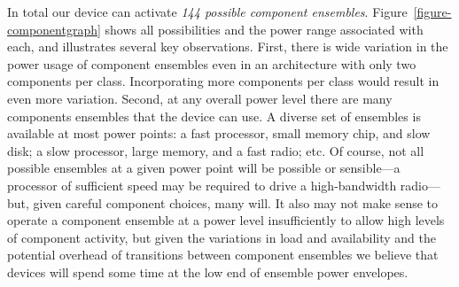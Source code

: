 In total our device can activate \textit{144 possible component ensembles}.
Figure~\ref{figure-componentgraph} shows all possibilities and the power
range associated with each, and illustrates several key observations. First,
there is wide variation in the power usage of component ensembles even in an
architecture with only two components per class. Incorporating more
components per class would result in even more variation. Second, at any
overall power level there are many components ensembles that the device can
use. A diverse set of ensembles is available at most power points: a fast
processor, small memory chip, and slow disk; a slow processor, large memory,
and a fast radio; etc. Of course, not all possible ensembles at a given power
point will be possible or sensible---a processor of sufficient speed may be
required to drive a high-bandwidth radio---but, given careful component
choices, many will. It also may not make sense to operate a component
ensemble at a power level insufficiently to allow high levels of component
activity, but given the variations in load and availability and the potential
overhead of transitions between component ensembles we believe that devices
will spend some time at the low end of ensemble power envelopes.

